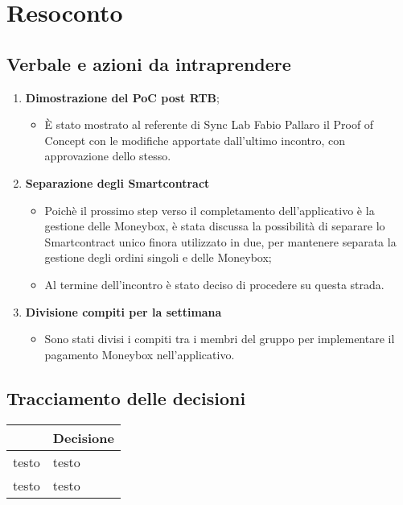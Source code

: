 \section{Resoconto}
\subsection{Verbale e azioni da intraprendere}

\begin{enumerate}
	\item \textbf{Dimostrazione del PoC post RTB};
	\begin{itemize}
		\item È stato mostrato al referente di Sync Lab Fabio Pallaro il Proof of Concept con le modifiche apportate dall'ultimo incontro, con approvazione dello stesso.
	\end{itemize}
	\item \textbf{Separazione degli Smartcontract}
	\begin{itemize}
		\item Poichè il prossimo step verso il completamento dell'applicativo è la gestione delle Moneybox,
		 è stata discussa la possibilità di separare lo Smartcontract unico finora utilizzato in due, per mantenere separata la gestione degli ordini 
		 singoli e delle Moneybox;
		\item Al termine dell'incontro è stato deciso di procedere su questa strada.
	\end{itemize}
	\item \textbf{Divisione compiti per la settimana}
	\begin{itemize}
		\item Sono stati divisi i compiti tra i membri del gruppo per implementare il pagamento Moneybox nell'applicativo.
	\end{itemize}
\end{enumerate}

\pagebreak

\subsection{Tracciamento delle decisioni}

\begin{table}[H]
	\centering
	\renewcommand{\arraystretch}{1.8}
	\begin{tabular}{c | p{10cm}}
		\rowcolor[HTML]{125E28}
		\multicolumn{1}{c}{\color[HTML]{FFFFFF} \textbf{ID}} &
		\multicolumn{1}{c}{\color[HTML]{FFFFFF} \textbf{Decisione}} \\
		\hline
		testo & testo \\ \hline
		testo & testo \\ 
	\end{tabular}
\end{table}